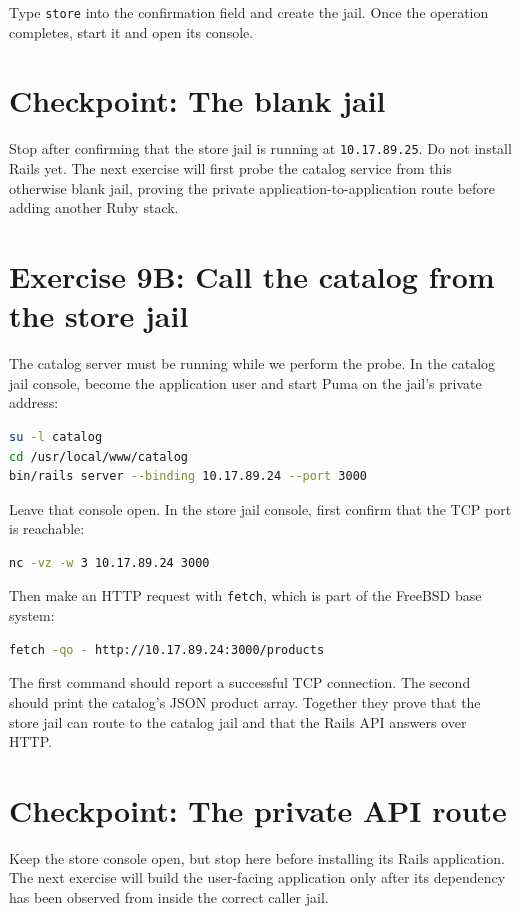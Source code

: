 Type \texttt{store} into the confirmation field and create the jail. Once the
operation completes, start it and open its console.

\section{Checkpoint: The blank jail}

Stop after confirming that the store jail is running at
\texttt{10.17.89.25}. Do not install Rails yet. The next exercise will first
probe the catalog service from this otherwise blank jail, proving the private
application-to-application route before adding another Ruby stack.

\section{Exercise 9B: Call the catalog from the store jail}

The catalog server must be running while we perform the probe. In the catalog
jail console, become the application user and start Puma on the jail's private
address:

\begin{lstlisting}[language=sh]
su -l catalog
cd /usr/local/www/catalog
bin/rails server --binding 10.17.89.24 --port 3000
\end{lstlisting}

Leave that console open. In the store jail console, first confirm that the TCP
port is reachable:

\begin{lstlisting}[language=sh]
nc -vz -w 3 10.17.89.24 3000
\end{lstlisting}

Then make an HTTP request with \texttt{fetch}, which is part of the FreeBSD
base system:

\begin{lstlisting}[language=sh]
fetch -qo - http://10.17.89.24:3000/products
\end{lstlisting}

The first command should report a successful TCP connection. The second should
print the catalog's JSON product array. Together they prove that the store jail
can route to the catalog jail and that the Rails API answers over HTTP.

\section{Checkpoint: The private API route}

Keep the store console open, but stop here before installing its Rails
application. The next exercise will build the user-facing application only
after its dependency has been observed from inside the correct caller jail.
